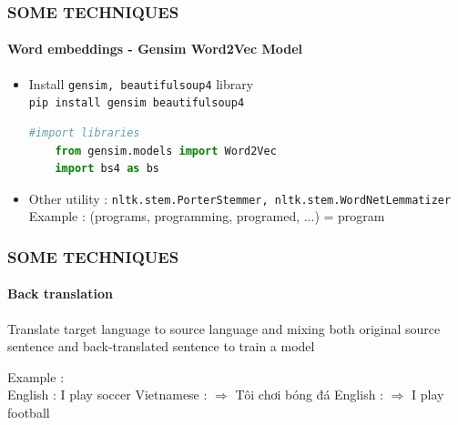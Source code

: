 \documentclass[10pt]{beamer}
\begin{document}
\begin{frame}[fragile]
    \frametitle{\textbf{SOME TECHNIQUES}}
    \framesubtitle{\textbf{Word embeddings} - Gensim Word2Vec Model}
    \begin{itemize}
        \item Install \texttt{gensim, beautifulsoup4} library\\
        \texttt{pip install gensim beautifulsoup4}
        \begin{lstlisting}[language=Python, caption=Library importation]
        #import libraries
    from gensim.models import Word2Vec
    import bs4 as bs
    \end{lstlisting}\pause
    \item Other utility : \texttt{nltk.stem.PorterStemmer, nltk.stem.WordNetLemmatizer} \\
    Example : (programs, programming, programed, ...) = program 
\end{itemize}
\end{frame}

\begin{frame}
    \frametitle{\textbf{SOME TECHNIQUES}}
    \framesubtitle{\textbf{Back translation}}
    \begin{definition}
        Translate target language to source language and mixing both original
         source sentence and back-translated sentence to train a model
    \end{definition}\pause
    Example : \\
    English : I play soccer \newline
    Vietnamese :  $\Rightarrow$ Tôi chơi bóng đá \newline
    English : $\Rightarrow$ I play football
\end{frame}
\end{document}
